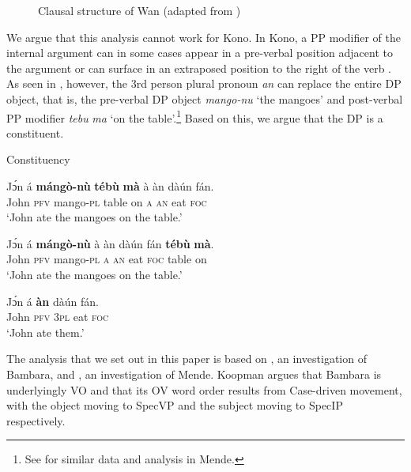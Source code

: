 \documentclass[output=paper,colorlinks,citecolor=brown,draftmode
]{langscibook}
\begin{document}
 \begin{figure}
 \caption{Clausal structure of Wan (adapted from \citealt[\#19]{nikitina2009syntax})}
   \label{fig:Clausal Structure of Wan} 
 \end{figure}

We argue that this analysis cannot work for Kono. In Kono, a PP modifier of the internal argument can in some cases appear in a pre-verbal position adjacent to the argument  or can surface in an extraposed position to the right of the verb  . As seen in , however, the 3rd person plural pronoun \textit{an} can replace the entire DP object, that is, the pre-verbal DP object \textit{mango-nu} ‘the mangoes’ and post-verbal PP modifier \textit{tebu} \textit{ma} ‘on the table’.\footnote{See \citet{SmithDiss} for similar data and analysis in Mende.}  Based on this, we argue that the DP is a constituent. 


\ea \label{ex:Kono:Complex Predicate constituency}
Constituency
\begin{xlist}

\ex \label{ex:Kono:Pied-Piped PP}
\gll Jɔ́n á \textbf{mángò-nù} \textbf{tébù} \textbf{mà} à àn dàún fán. \\
John \textsc{pfv} mango-\textsc{pl} table on \textsc{a} \textsc{an} eat \textsc{foc}\\
\glt `John ate the mangoes on the table.'

\ex \label{ex:Kono:In-situ PP}
\gll Jɔ́n á \textbf{mángò-nù} à àn dàún fán \textbf{tébù} \textbf{mà}. \\
John \textsc{pfv} mango-\textsc{pl} \textsc{a} \textsc{an} eat \textsc{foc} table on\\
\glt `John ate the mangoes on the table.'

\ex \label{ex:Kono:PN PP}
\gll Jɔ́n á \textbf{àn}  dàún fán. \\
John \textsc{pfv} \textsc{3pl} eat \textsc{foc}\\
\glt `John ate them.'

\end{xlist}
\z 

The analysis that we set out in this paper is based on \citet{koopman1992absence}, an investigation of Bambara, and \citet{SmithDiss}, an investigation of Mende. Koopman argues that Bambara is underlyingly VO and that its OV word order results from Case-driven movement, with the object moving to SpecVP and the subject moving to SpecIP respectively. 
\end{document}
